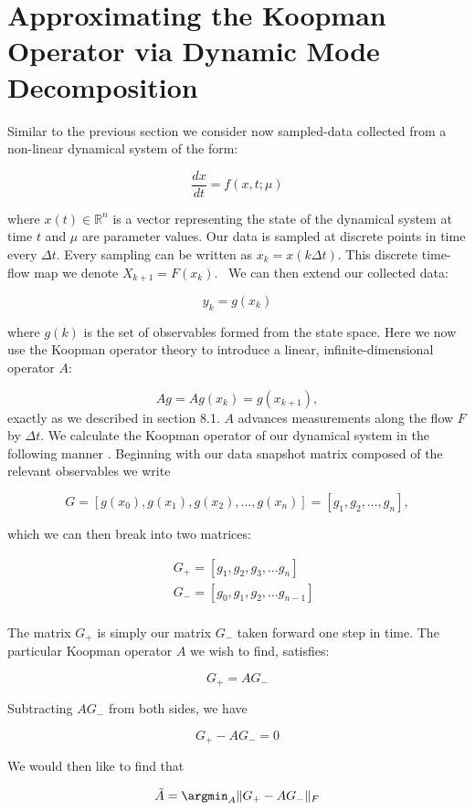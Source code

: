 \section{Approximating the Koopman Operator via Dynamic Mode Decomposition}
Similar to the previous section we consider now sampled-data collected from a non-linear dynamical system
of the form:

$$
\frac{dx}{dt} = f(x,t; \mu)
$$

\noindent where $x(t)\in \mathbb{R}^{n}$ is a vector representing the state of the dynamical system
at time $t$ and $\mu$ are parameter values.
 Our data is sampled at discrete points in time every $\Delta t$. Every sampling can be written as $x_{k} = x(k \Delta t)$. This 
discrete time-flow map we denote $X_{k+1} = F(x_k)$. \
We can then extend our collected data:

$$
y_k = g(x_k)
$$

\noindent where $g(k)$ is the set of observables formed from the state space. 
Here we now use the Koopman operator theory to introduce a
 linear, infinite-dimensional operator $A$:

$$
A g = A g(x_k) = g(x_{k+1}),
$$
\noindent exactly as we described in section 8.1. $A$ advances measurements along the flow $F$ by $\Delta t$.
We calculate the Koopman operator of our dynamical system in the following manner \cite{brunton2021modern}.
Beginning with our data snapshot matrix composed of the relevant observables we write

$$
G = [g(x_0), g(x_1), g(x_2), \dots ,g(x_n)] = [g_1,g_2,\dots, g_n],
$$

\noindent which we can then break into two matrices:

\begin{align*}
    & G_+ = [g_1, g_2, g_3, \dots g_n]\\
    & G_- = [g_0, g_1, g_2, \dots g_{n-1}]\\\
\end{align*}

\noindent The matrix $G_+$ is simply our matrix $G_-$ taken forward one step in time. 
The particular Koopman operator ${A}$ we wish to find, satisfies:

$$
G_+ = AG_-
$$

\noindent Subtracting $AG_-$ from both sides, we have

$$
G_+ - {A}G_- = 0
$$

\noindent We would then like to find that 

$$
{\tilde A} = {\argmin_{A}} \|G_+ - {A}G_- \|_{F}
$$

